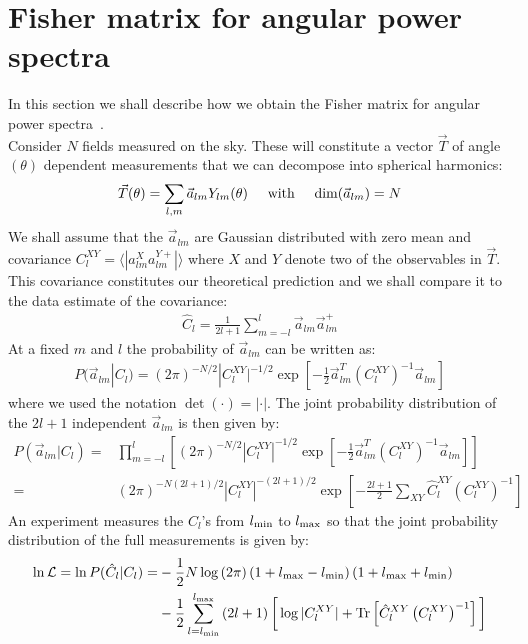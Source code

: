 \documentclass[prd,nofootinbib,showpacs]{revtex4}
\begin{document}
\section{Fisher matrix for angular power spectra}
%
In this section we shall describe how we obtain the Fisher matrix for angular power spectra~\cite{Tegmark:1996bz}. \\
%
Consider $N$ fields measured on the sky. These will constitute a vector $\vec{T}$ of angle $(\theta)$ dependent measurements that we can decompose into spherical harmonics:
%
\begin{align}
\vec{T}(\theta) = \sum_{l,m} \vec{a}_{lm} Y_{lm}(\theta) \hspace{0.5cm}\mbox{with}\hspace{0.5cm} {\rm dim}(\vec{a}_{lm}) =N
\end{align}
%
We shall assume that the $\vec{a}_{lm}$ are Gaussian distributed with zero mean and covariance $C_{l}^{XY} = \langle | a_{lm}^X a_{lm}^{Y+} |\rangle$ where $X$ and $Y$ denote two of the observables in $\vec{T}$. 
This covariance constitutes our theoretical prediction and we shall compare it to the data estimate of the covariance: 
%
\begin{align}
\hat{C}_{l} = \frac{1}{2l+1} \sum_{m=-l}^l \vec{a}_{lm} \vec{a}_{lm}^+
\end{align}
%
At a fixed $m$ and $l$ the probability of $\vec{a}_{lm}$ can be written as:
%
\begin{align}
P(\vec{a}_{lm} | C_l ) = (2\pi)^{-N/2} |C_l^{XY}|^{-1/2} \exp \left[ -\frac{1}{2} \vec{a}_{lm}^T \left( C_l^{XY} \right)^{-1} \vec{a}_{lm} \right]
\end{align}
%
where we used the notation $\det(\cdot) = |\cdot|$.
The joint probability distribution of the $2l+1$ independent $\vec{a}_{lm}$ is then given by:
%
\begin{align}
P(\vec{a}_{lm} | C_l ) =& \prod_{m=-l}^l \left[  (2\pi)^{-N/2}  |C_l^{XY}|^{-1/2} \exp \left[ -\frac{1}{2} \vec{a}_{lm}^T \left( C_l^{XY} \right)^{-1} \vec{a}_{lm} \right] \right] \nonumber \\
=& \left( 2 \pi \right)^{-N(2l+1)/2} |C_l^{XY}|^{-(2l+1)/2} \exp \left[ -\frac{2l+1}{2} \sum_{XY} \hat{C}_l^{XY}\left( C_l^{XY} \right)^{-1}  \right]
\end{align}
%
An experiment measures the $C_l$'s from $l_{\rm min}$ to $l_{\rm max}$ so that the joint probability distribution of the full measurements is given by:
%
\begin{align}
\ln \mathcal{L} = \ln P( \hat{C}_l | C_l ) =& -\frac{1}{2} N\log\left( 2\pi\right)\left( 1+l_{\rm max} - l_{\rm min} \right)\left( 1+l_{\rm max} + l_{\rm min} \right) \nonumber \\
&-\frac{1}{2}\sum_{l=l_{\rm min}}^{l_{\rm max}} \left( 2l+1\right) \bigg[ \log |C_l^{XY}| +{\rm Tr}\left[   \hat{C}_l^{XY}\left( C_l^{XY} \right)^{-1} \right] \bigg]
\end{align}
\end{document}
